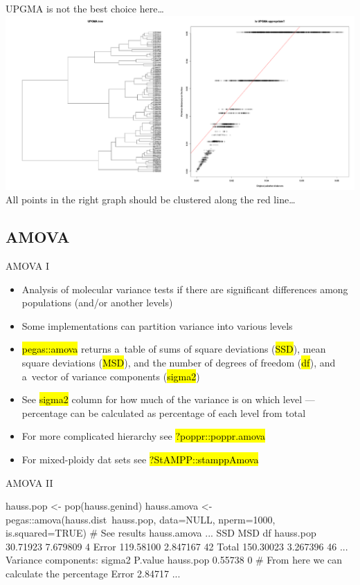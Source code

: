 \documentclass[compress, ucs, xelatex, 11pt, xcolor=svgnames,
  hyperref={
    bookmarks=true,
    unicode=true,
    colorlinks=true,
    pdftitle={Molecular data in R},
    plainpages=false,
    pdfauthor={Vojtech Zeisek},
    pdfsubject={Course about phylogeny and evolution in R},
    pdfcreator={XeLaTeX},
    pdfkeywords={R, evolution, phylogeny, molecular data},
    linkcolor=Tomato,
    anchorcolor=SaddleBrown,
    citecolor=Goldenrod,
    filecolor=DarkMagenta,
    menucolor=Sienna,
    urlcolor=DarkTurquoise,
    pdftex},
  url={hyphens, lowtilde} %
  ]{beamer}
\renewcommand{\texttt}[1]{\hl{\ttfamily #1}}
\begin{document}
\begin{frame}{UPGMA is not the best choice here\ldots}
  \includegraphics[width=\textwidth]{upgma.png}
  \vfil
  All points in the right graph should be clustered along the red line\ldots
  \vfill
\end{frame}

\subsection{AMOVA}

\begin{frame}{AMOVA I}
  \begin{itemize}
    \item Analysis of molecular variance tests if there are significant differences among populations (and/or another levels)
    \item Some implementations can partition variance into various levels
    \item \texttt{pegas::amova} returns a~table of sums of square deviations (\texttt{SSD}), mean square deviations (\texttt{MSD}), and the number of degrees of freedom (\texttt{df}), and a~vector of variance components (\texttt{sigma2})
    \item See \texttt{sigma2} column for how much of the variance is on which level --- percentage can be calculated as percentage of each level from total
    \item For more complicated hierarchy see \texttt{?poppr::poppr.amova}
    \item For mixed-ploidy dat sets see \texttt{?StAMPP::stamppAmova}
  \end{itemize}
\end{frame}

\begin{frame}[fragile]{AMOVA II}
  \begin{spluscode}
    hauss.pop <- pop(hauss.genind)
    hauss.amova <- pegas::amova(hauss.dist~hauss.pop, data=NULL,
      nperm=1000, is.squared=TRUE)
    # See results
    hauss.amova
    ...
                    SSD      MSD df
    hauss.pop  30.71923 7.679809  4
    Error     119.58100 2.847167 42
    Total     150.30023 3.267396 46
    ...
    Variance components:
               sigma2 P.value
    hauss.pop 0.55738       0 # From here we can calculate the percentage
    Error     2.84717
    ...
  \end{spluscode}
\end{frame}
\end{document}
